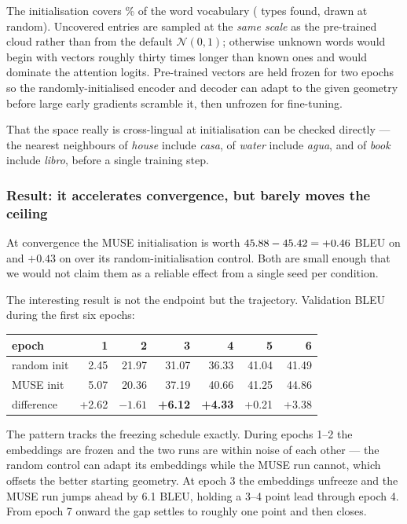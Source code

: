 \documentclass[11pt,a4paper]{article}
\begin{document}
The initialisation covers \MuseCoveragePercent\% of the word vocabulary
(\MuseCovered{} types found, \MuseRandom{} drawn at random). Uncovered entries
are sampled at the \emph{same scale} as the pre-trained cloud rather than from
the default $\mathcal{N}(0,1)$; otherwise unknown words would begin with
vectors roughly thirty times longer than known ones and would dominate the
attention logits. Pre-trained vectors are held frozen for two epochs so the
randomly-initialised encoder and decoder can adapt to the given geometry before
large early gradients scramble it, then unfrozen for fine-tuning.

That the space really is cross-lingual at initialisation can be checked
directly --- the nearest neighbours of \emph{house} include \emph{casa}, of
\emph{water} include \emph{agua}, and of \emph{book} include \emph{libro},
before a single training step.

\subsubsection*{Result: it accelerates convergence, but barely moves the ceiling}

At convergence the MUSE initialisation is worth
$45.88 - 45.42 = +0.46$ BLEU on \entos{} and $+0.43$
on \estoen{} over its random-initialisation control. Both are small enough that
we would not claim them as a reliable effect from a single seed per condition.

The interesting result is not the endpoint but the trajectory. Validation BLEU
during the first six epochs:

\begin{center}
\begin{tabular}{@{}lrrrrrr@{}}
\toprule
epoch & 1 & 2 & 3 & 4 & 5 & 6 \\
\midrule
random init & 2.45 & 21.97 & 31.07 & 36.33 & 41.04 & 41.49 \\
MUSE init & 5.07 & 20.36 & 37.19 & 40.66 & 41.25 & 44.86 \\
\midrule
difference & +2.62 & $-1.61$ & \textbf{+6.12} & \textbf{+4.33} & +0.21 & +3.38 \\
\bottomrule
\end{tabular}
\end{center}

The pattern tracks the freezing schedule exactly. During epochs 1--2 the
embeddings are frozen and the two runs are within noise of each other --- the
random control can adapt its embeddings while the MUSE run cannot, which offsets
the better starting geometry. At epoch 3 the embeddings unfreeze and the MUSE
run jumps ahead by 6.1 BLEU, holding a 3--4 point lead through epoch 4. From
epoch 7 onward the gap settles to roughly one point and then closes.
\end{document}
